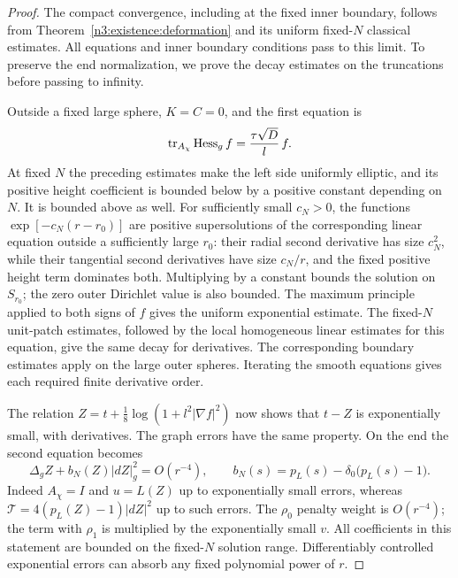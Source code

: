 \begin{proof}
The compact convergence, including at the fixed inner boundary, follows
from Theorem~\ref{n3:existence:deformation} and its uniform fixed-\(N\)
classical estimates. All equations and inner boundary conditions pass
to this limit. To preserve the end normalization, we prove the decay
estimates on the truncations before passing to infinity.

Outside a fixed large sphere, \(K=C=0\), and the first equation is
\[
 \operatorname{tr}_{A_\chi}\operatorname{Hess}_g f=\frac{\tau\sqrt D}{l}\,f.
\]
At fixed \(N\) the preceding estimates make the left side uniformly
elliptic, and its positive height coefficient is bounded below by a
positive constant depending on \(N\). It is bounded above as well.
For sufficiently small \(c_N>0\), the functions
\(\exp[-c_N(r-r_0)]\) are positive supersolutions of the corresponding
linear equation outside a sufficiently large \(r_0\): their radial
second derivative has size \(c_N^2\), while their tangential second
derivatives have size \(c_N/r\), and the fixed positive height term
dominates both. Multiplying by a constant bounds the solution on
\(S_{r_0}\); the zero outer Dirichlet value is also bounded.
The maximum principle applied to both signs of \(f\) gives the
uniform exponential estimate. The fixed-\(N\) unit-patch estimates,
followed by the local homogeneous linear estimates for this equation,
give the same decay for derivatives. The corresponding boundary
estimates apply on the large outer spheres. Iterating the smooth
equations gives each required finite derivative order.

The relation \(Z=t+\tfrac18\log(1+l^2|\nabla f|^2)\) now shows that
\(t-Z\) is exponentially small, with derivatives. The graph errors
have the same property. On the end the second equation becomes
\begin{equation}\label{n3:limit:Z-end}
 \Delta_gZ+b_N(Z)|dZ|_g^2=O(r^{-4}),\qquad
 b_N(s)=p_L(s)-\delta_0\bigl(p_L(s)-1\bigr).
\end{equation}
Indeed \(A_\chi=I\) and \(u=L(Z)\) up to exponentially small errors,
whereas
\(\mathcal T=4(p_L(Z)-1)|dZ|^2\) up to such errors.
The \(\rho_0\) penalty weight is \(O(r^{-4})\); the term with
\(\rho_1\) is multiplied by the exponentially small \(v\).
All coefficients in this statement are bounded on the fixed-\(N\)
solution range. Differentiably controlled exponential errors can
absorb any fixed polynomial power of \(r\).


\end{proof}
